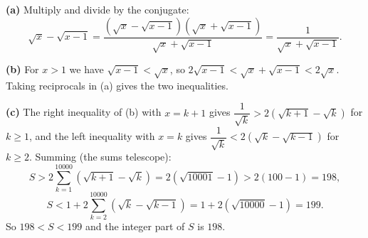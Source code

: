\textbf{(a)} Multiply and divide by the conjugate:
\[\sqrt x-\sqrt{x-1}=\dfrac{\left(\sqrt x-\sqrt{x-1}\right)\left(\sqrt x+\sqrt{x-1}\right)}{\sqrt x+\sqrt{x-1}}=\boxed{\dfrac{1}{\sqrt x+\sqrt{x-1}}}.\]

\textbf{(b)} For $x>1$ we have $\sqrt{x-1}<\sqrt x$, so $2\sqrt{x-1}<\sqrt x+\sqrt{x-1}<2\sqrt x$. Taking reciprocals in (a) gives the two inequalities.

\textbf{(c)} The right inequality of (b) with $x=k+1$ gives $\dfrac{1}{\sqrt k}>2\left(\sqrt{k+1}-\sqrt k\right)$ for $k\ge1$, and the left inequality with $x=k$ gives $\dfrac{1}{\sqrt k}<2\left(\sqrt k-\sqrt{k-1}\right)$ for $k\ge2$. Summing (the sums telescope):
\[S>2\sum_{k=1}^{10000}\left(\sqrt{k+1}-\sqrt k\right)=2\left(\sqrt{10001}-1\right)>2(100-1)=198,\]
\[S<1+2\sum_{k=2}^{10000}\left(\sqrt k-\sqrt{k-1}\right)=1+2\left(\sqrt{10000}-1\right)=199.\]
So $198<S<199$ and the integer part of $S$ is $\boxed{198}$.
